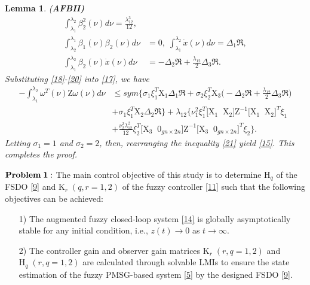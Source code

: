 \documentclass[preprint,11pt]{elsarticle}
\newtheorem{lemma}{Lemma}
\begin{document}
\begin{lemma} {(\bf AFBII)}
\begin{align}
\int^{\lambda_2}_{\lambda_1}\beta^2_2(\nu)d\nu= \frac{\lambda_{12}^3}{12},\label{18}\\
\int^{\lambda_1}_{\lambda_2}\beta_1(\nu)\beta_2(\nu)d\nu&=0,\;
\int^{\lambda_2}_{\lambda_1}\dot{x}(\nu)d\nu=\Delta_1\Re,\label{19}\\
\int^{\lambda_2}_{\lambda_1}\beta_2(\nu)\dot{x}(\nu)d\nu&=-\Delta_2\Re+\frac{\lambda_{12}}{2}\Delta_3\Re.\label{20}
\end{align}
Substituting \eqref{18}-\eqref{20} into \eqref{17}, we have
\begin{align}\label{21}
-\int^{\lambda_2}_{\lambda_1}{\omega}^T(\nu)\mathrm{Z}{\omega}(\nu)d\nu
&\leq sym\Big\{  \sigma_1\xi_1^T\mathrm{X}_1\Delta_1\Re
+\sigma_2\xi_2^T\mathrm{X}_3\big(-\Delta_2\Re+\frac{\lambda_{12}}{2}\Delta_3\Re\big)\nonumber\\
&+ \sigma_1\xi_1^T \mathrm{X}_2\Delta_2\Re\Big\}+\lambda_{12}\Big\{ \nu^2_1\xi_1^T \big[\mathrm{X}_1\;\;\mathrm{X}_2 \big]\mathrm{Z}^{-1}\big[ \mathrm{X}_1\;\;\mathrm{X}_2 \big]^T\xi_1\nonumber\\
&+\frac{\nu^2_2\lambda_{12}^2}{12}\xi_2^T\big[ \mathrm{X}_3\;\;0_{gn\times2n} \big]\mathrm{Z}^{-1}\big[ \mathrm{X}_3\;\;0_{gn\times2n} \big]^T\xi_2
\Big\}.
\end{align}
Letting $\sigma_1=1$ and $\sigma_2=2$, then, rearranging the inequality \eqref{21} yield \eqref{15}. This completes the proof.
\end{lemma}
\vspace{-0.3cm}
${\bf Problem\;1:}$ {The main control objective of this study is to determine $\mathrm{H}_q$ of the FSDO \eqref{9} and $\mathrm{K}_r\;(q,r=1,2)$ of the fuzzy controller \eqref{11} such that the following objectives can be achieved:}
\begin{itemize}
\item[1)] {The augmented fuzzy closed-loop system \eqref{14} is globally asymptotically stable for any initial condition, i.e., $z(t)\rightarrow0$ as $t\rightarrow\infty$.}
\item[2)] {The controller gain and observer gain matrices $\mathrm{K}_r\;(r,q=1,2)$ and $\mathrm{H}_q\;(r,q=1,2)$ are calculated through solvable LMIs to ensure the state estimation of the fuzzy PMSG-based system \eqref{5} by the designed FSDO \eqref{9}.}
\end{itemize}
\vspace{-0.3cm}
\end{document}
